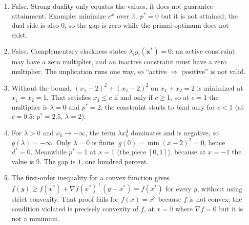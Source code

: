 \begin{enumerate}[label=\textbf{23.\arabic*}]
  \item False. Strong duality only equates the values, it does not guarantee attainment.
        Example: minimize $e^{x}$ over $\mathbb{R}$. $p^{*}=0$ but it is not attained;
        the dual side is also $0$, so the gap is zero while the primal optimum does not
        exist.

  \item False. Complementary slackness states $\lambda_{i}g_{i}(\mathbf{x}^{*})=0$:
        an active constraint may have a zero multiplier, and an inactive constraint must
        have a zero multiplier. The implication runs one way, so ``active $\Rightarrow$
        positive'' is not valid.

  \item Without the bound, $(x_{1}-2)^{2}+(x_{2}-2)^{2}$ on $x_{1}+x_{2}=2$ is minimized
        at $x_{1}=x_{2}=1$. That satisfies $x_{1}\le c$ if and only if $c\ge1$, so
        at $c=1$ the multiplier is $\lambda=0$ and $p^{*}=2$; the constraint starts to
        bind only for $c<1$ (at $c=0.5$: $p^{*}=2.5$, $\lambda=2$).

  \item For $\lambda>0$ and $x_{k}\to-\infty$, the term $\lambda x_{k}^{3}$ dominates
        and is negative, so $g(\lambda)=-\infty$. Only $\lambda=0$ is finite:
        $g(0)=\min(x-2)^{2}=0$, hence $d^{*}=0$. Meanwhile $p^{*}=1$ at $x=1$ (the piece
        $[0,1]$), because at $x=-1$ the value is $9$. The gap is $1$, one hundred percent.

  \item The first-order inequality for a convex function gives
        $f(y)\ge f(x^{*})+\nabla f(x^{*})^{\top}(y-x^{*})=f(x^{*})$ for every $y$,
        without using strict convexity. That proof fails for $f(x)=x^{3}$ because
        $f$ is not convex; the condition violated is precisely convexity of $f$, at $x=0$
        where $\nabla f=0$ but it is not a minimum.
\end{enumerate}
